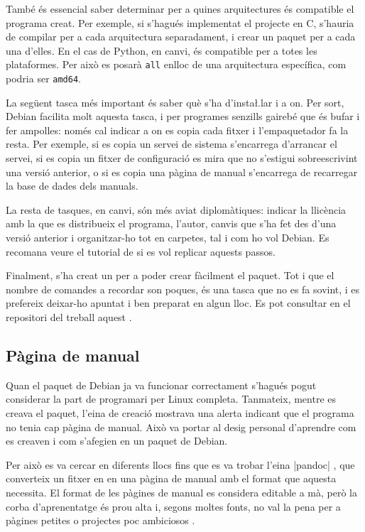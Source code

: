 També és essencial saber determinar per a quines arquitectures és compatible el
programa creat. Per exemple, si s'hagués implementat el projecte en C, s'hauria
de compilar per a cada arquitectura separadament, i crear un paquet per a cada
una d'elles. En el cas de Python, en canvi, és compatible per a totes les
plataformes. Per això es posarà \texttt{all} enlloc de una arquitectura específica,
com podria ser \texttt{amd64}.

La següent tasca més important és saber què s'ha d'insta\l.lar i a on. Per sort,
Debian facilita molt aquesta tasca, i per programes senzills gairebé que és
bufar i fer ampolles: només cal indicar a on es copia cada fitxer i l'empaquetador
fa la resta. Per exemple, si es copia un servei de sistema s'encarrega d'arrancar
el servei, si es copia un fitxer de configuració es mira que no s'estigui
sobreescrivint una versió anterior, o si es copia una pàgina de manual s'encarrega
de recarregar la base de dades dels manuals.

La resta de tasques, en canvi, són més aviat diplomàtiques: indicar la llicència
amb la que es distribueix el programa, l'autor, canvis que s'ha fet des d'una
versió anterior i organitzar-ho tot en carpetes, tal i com ho vol Debian.
Es recomana veure el tutorial de \cite{DebCreation} si es vol replicar aquests passos.

Finalment, s'ha creat un  per a poder crear fàcilment el
paquet. Tot i que el nombre de comandes a recordar son poques, és una tasca que
no es fa sovint, i es prefereix deixar-ho apuntat i ben preparat en algun lloc.
Es pot consultar en el repositori del treball aquest .

\subsection{Pàgina de manual}

Quan el paquet de Debian ja va funcionar correctament s'hagués pogut considerar
la part de programari per Linux completa. Tanmateix, mentre es creava el paquet,
l'eina de creació mostrava una alerta indicant que el programa no tenia cap
pàgina de manual. Això va portar al desig personal d'aprendre com es creaven
i com s'afegien en un paquet de Debian.

Per això es va cercar en diferents llocs fins que es va trobar l'eina
\ord|pandoc| \cite{PandocTutorial},
que converteix un fitxer en  en una pàgina de manual amb el
format que aquesta necessita. El format de les pàgines de manual es considera
editable a mà, però la corba d'aprenentatge és prou alta i, segons moltes fonts,
no val la pena per a pàgines petites o projectes poc ambiciosos \cite{Manpage}.

